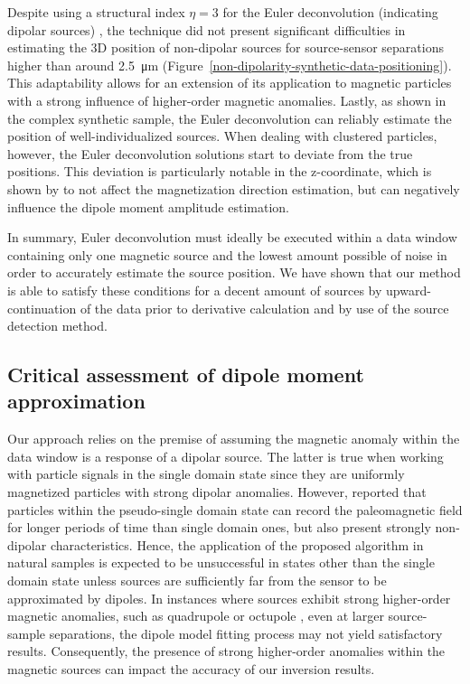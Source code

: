 Despite using a structural index $\eta = 3$ for the Euler deconvolution (indicating dipolar sources) , the technique did not present significant difficulties in estimating the 3D position of non-dipolar sources for source-sensor separations higher than around \qty{2.5}{\um} (Figure~\ref{non-dipolarity-synthetic-data-positioning}). This adaptability allows for an extension of its application to magnetic particles with a strong influence of higher-order magnetic anomalies.
Lastly, as shown in the complex synthetic sample, the Euler deconvolution can reliably estimate the position of well-individualized sources. When dealing with clustered particles, however, the Euler deconvolution solutions start to deviate from the true positions. This deviation is particularly notable in the z-coordinate, which is shown by \cite{Oliveira2015Estimation} to not affect the magnetization direction estimation, but can negatively influence the dipole moment amplitude estimation.

In summary, Euler deconvolution must ideally be executed within a data window containing only one magnetic source and the lowest amount possible of noise in order to accurately estimate the source position. We have shown that our method is able to satisfy these conditions for a decent amount of sources by upward-continuation of the data prior to derivative calculation and by use of the source detection method.

\subsection{Critical assessment of dipole moment approximation}
\label{dipole-reliability}

Our approach relies on the premise of assuming the magnetic anomaly within
the data window is a response of a dipolar source.
The latter is true when working
with particle signals in the single domain state since they are uniformly magnetized particles \citep{Dunlop1997} with strong dipolar anomalies.
However, \cite{Nagy2017} reported that particles within the pseudo-single domain state can record the paleomagnetic field for longer periods of time than single domain ones, but also present strongly non-dipolar characteristics.
Hence, the application of the proposed algorithm in natural samples is expected to be unsuccessful in states other than the single domain state unless sources are sufficiently far from the sensor to be approximated by dipoles. In instances where sources exhibit strong higher-order magnetic anomalies, such as quadrupole or octupole \citep[\textit{e.g.},][]{CortesOrtuno2021}, even at larger source-sample separations, the dipole model fitting process may not yield satisfactory results. Consequently, the presence of strong higher-order anomalies within the magnetic sources can impact the accuracy of our inversion results.

